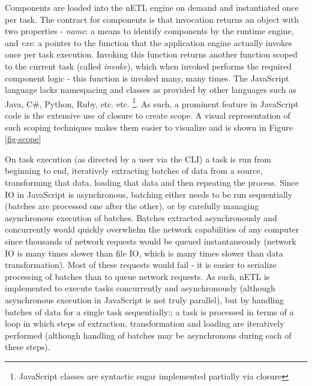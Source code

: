 Components are loaded into the nETL engine on demand and instantiated once per task. The contract for components is that invocation returns an object with two properties - \textit{name}: a means to identify components by the runtime engine, and \textit{exe}: a pointer to the function that the application engine actually invokes once per task execution. Invoking this function returns another function scoped to the current task (called \textit{invoke}), which when invoked performs the required component logic - this function is invoked many, many times. The JavaScript language lacks namespacing and classes as provided by other languages such as Java, C\#, Python, Ruby, etc. etc. \footnote{JavaScript classes are syntactic sugar implemented partially via closure}. As such, a prominent feature in JavaScript code is the extensive use of closure to create scope. A visual representation of such scoping techniques makes them easier to visualize and is shown in Figure \ref{fig-scope}



On task execution (as directed by a user via the CLI) a task is run from beginning to end, iteratively extracting batches of data from a source, transforming that data, loading that data and then repeating the process. Since IO in JavaScript is asynchronous, batching either needs to be run sequentially (batches are processed one after the other), or by carefully managing asynchronous execution of batches. Batches extracted asynchronously and concurrently would quickly overwhelm the network capabilities of any computer since thousands of network requests would be queued instantaneously (network IO is many times slower than file IO, which is many times slower than data transformation). Most of these requests would fail - it is easier to serialize processing of batches than to queue network requests. As such, nETL is implemented to execute tasks concurrently and asynchronously (although asynchronous execution in JavaScript is not truly parallel), but by handling batches of data for a single task sequentially:; a task is processed in terms of a loop in which steps of extraction, transformation and loading are iteratively performed (although handling of batches may be asynchronous during each of these steps).

